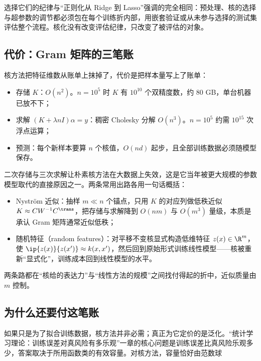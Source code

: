 选择它们的纪律与``正则化从 Ridge 到 Lasso''强调的完全相同：预处理、核的选择与超参数的调节都必须包在每个训练折内部，用嵌套验证或从未参与选择的测试集评估整个流程。核化没有改变评估纪律，只改变了被评估的对象。

\subsection{代价：Gram 矩阵的三笔账}

核方法把特征维数从账单上抹掉了，代价是把样本量写上了账单：

\begin{itemize}
\tightlist
\item
  存储 \(K\)：\(O(n^{2})\)。\(n=10^{5}\) 时 \(K\) 有 \(10^{10}\) 个双精度数，约 80 GB，单台机器已放不下；
\item
  求解 \((K+\lambda nI)\alpha=y\)：稠密 Cholesky 分解 \(O(n^{3})\)。\(n=10^{5}\) 约需 \(10^{15}\) 次浮点运算；
\item
  预测：每个新样本要算 \(n\) 个核值，\(O(nd)\) 起步，且全部训练数据必须随模型保存。
\end{itemize}

二次存储与三次求解让朴素核方法在大数据上失效，这是它当年被更大规模的参数模型取代的直接原因之一。两条常用出路各用一句话概括：

\begin{itemize}
\tightlist
\item
  Nyström 近似：抽样 \(m\ll n\) 个锚点，只用 \(K\) 的对应列做低秩近似 \(K\approx CW^{-1}C^{\trans}\)，把存储与求解降到 \(O(nm)\) 与 \(O(m^{3})\) 量级，本质是承认 Gram 矩阵通常近似低秩；
\item
  随机特征（random features）：对平移不变核显式构造低维特征 \(z(x)\in\R^{m}\)，使 \(\ip{z(x)}{z(x')}\approx k(x,x')\)，然后回到原始形式训练线性模型——核被重新``显式化''，训练成本回到线性模型的水平。
\end{itemize}

两条路都在``核给的表达力''与``线性方法的规模''之间找付得起的折中，近似质量由 \(m\) 控制。

\subsection{为什么还要付这笔账}

如果只是为了拟合训练数据，核方法并非必需；真正为它定价的是泛化。``统计学习理论：训练误差对真风险有多乐观''一章的核心问题是训练误差比真风险乐观多少，答案取决于所用函数类的有效容量。对核方法，容量恰好由范数球

